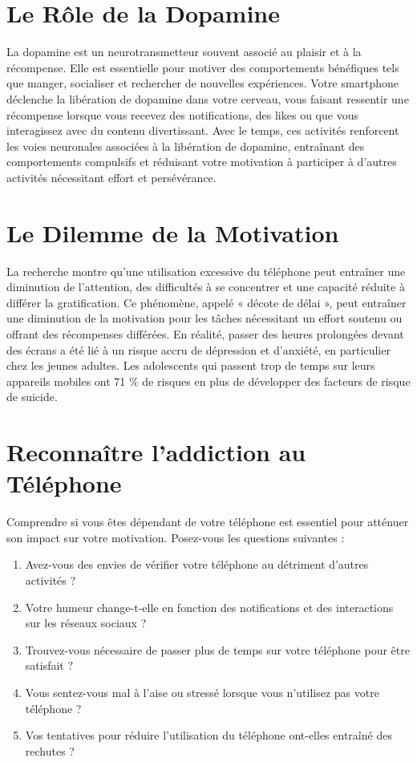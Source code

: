 \documentclass[a4paper, 10pt, garamond]{book}
\begin{document}
\section{Le Rôle de la Dopamine}

La dopamine est un neurotransmetteur souvent associé au plaisir et à la
récompense. Elle est essentielle pour motiver des comportements bénéfiques tels
que manger, socialiser et rechercher de nouvelles expériences. Votre smartphone
déclenche la libération de dopamine dans votre cerveau, vous faisant ressentir
une récompense lorsque vous recevez des notifications, des likes ou que vous
interagissez avec du contenu divertissant. Avec le temps, ces activités
renforcent les voies neuronales associées à la libération de dopamine,
entraînant des comportements compulsifs et réduisant votre motivation à
participer à d'autres activités nécessitant effort et persévérance.

\section{Le Dilemme de la Motivation}

La recherche montre qu'une utilisation excessive du téléphone peut entraîner une
diminution de l'attention, des difficultés à se concentrer et une capacité
réduite à différer la gratification. Ce phénomène, appelé « décote de délai »,
peut entraîner une diminution de la motivation pour les tâches nécessitant un
effort soutenu ou offrant des récompenses différées. En réalité, passer des
heures prolongées devant des écrans a été lié à un risque accru de dépression et
d'anxiété, en particulier chez les jeunes adultes. Les adolescents qui passent
trop de temps sur leurs appareils mobiles ont 71 \% de risques en plus de
développer des facteurs de risque de suicide.

\section{Reconnaître l'addiction au Téléphone}

Comprendre si vous êtes dépendant de votre téléphone est essentiel pour atténuer
son impact sur votre motivation. Posez-vous les questions suivantes :
\begin{enumerate}
	\item Avez-vous des envies de vérifier votre téléphone au détriment d'autres
	      activités ?
	\item Votre humeur change-t-elle en fonction des notifications et des
	      interactions sur les réseaux sociaux ?
	\item Trouvez-vous nécessaire de passer plus de temps sur votre téléphone pour
	      être satisfait ?
	\item Vous sentez-vous mal à l'aise ou stressé lorsque vous n'utilisez pas
	      votre téléphone ?
	\item Vos tentatives pour réduire l'utilisation du téléphone ont-elles
	      entraîné des rechutes ?
\end{enumerate}
\end{document}
